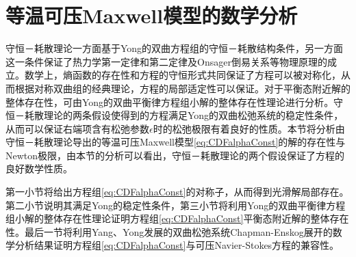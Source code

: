 	\section{等温可压Maxwell模型的数学分析}
	守恒－耗散理论一方面基于Yong的双曲方程组的守恒－耗散结构条件，另一方面这一条件保证了热力学第一定律和第二定律及Onsager倒易关系等物理原理的成立。数学上，熵函数的存在性和方程的守恒形式共同保证了方程可以被对称化，从而根据对称双曲组的经典理论，方程的局部适定性可以保证\cite{kato1975cauchy,majda2012compressible}。对于平衡态附近解的整体存在性，可由Yong的双曲平衡律方程组小解的整体存在性理论进行分析\cite{yong2004entropy,kawashima2009decay}。守恒－耗散理论的两条假设使得到的方程满足Yong的双曲松弛系统的稳定性条件\cite{yong1999singular}，从而可以保证右端项含有松弛参数$\epsilon$时的松弛极限有着良好的性质。本节将分析由守恒－耗散理论导出的等温可压Maxwell模型\eqref{eq:CDFalphaConst}的解的存在性与Newton极限，由本节的分析可以看出，守恒－耗散理论的两个假设保证了方程的良好数学性质。

	第一小节将给出方程组\eqref{eq:CDFalphaConst}的对称子，从而得到光滑解局部存在。第二小节说明其满足Yong的稳定性条件，第三小节将利用Yong的双曲平衡律方程组小解的整体存在性理论证明方程组\eqref{eq:CDFalphaConst}平衡态附近解的整体存在性\cite{yong2004entropy,kawashima2009decay}。最后一节将利用Yang、Yong发展的双曲松弛系统Chapman-Enskog展开的数学分析结果\cite{yang2015validity}证明方程组\eqref{eq:CDFalphaConst}与可压Navier-Stokes方程的兼容性。

